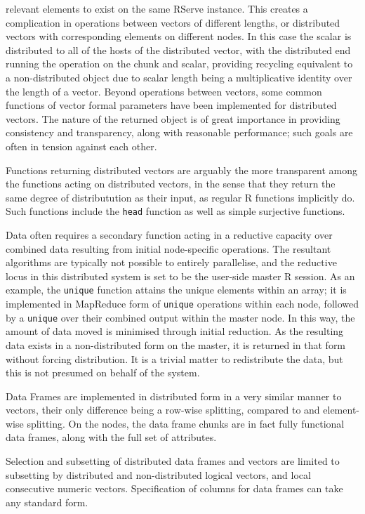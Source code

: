 relevant elements to exist on the same RServe instance. This creates a
complication in operations between vectors of different lengths, or
distributed vectors with corresponding elements on different nodes. In
this case the scalar is distributed to all of the hosts of the
distributed vector, with the distributed end running the operation on
the chunk and scalar, providing recycling equivalent to a
non-distributed object due to scalar length being a multiplicative
identity over the length of a vector. Beyond operations between vectors,
some common functions of vector formal parameters have been implemented
for distributed vectors. The nature of the returned object is of great
importance in providing consistency and transparency, along with
reasonable performance; such goals are often in tension against each
other.

Functions returning distributed vectors are arguably the more
transparent among the functions acting on distributed vectors, in the
sense that they return the same degree of distributution as their input,
as regular R functions implicitly do. Such functions include the
\texttt{head} function as well as simple surjective functions.

Data often requires a secondary function acting in a reductive capacity
over combined data resulting from initial node-specific operations. The
resultant algorithms are typically not possible to entirely parallelise,
and the reductive locus in this distributed system is set to be the
user-side master R session. As an example, the \texttt{unique} function
attains the unique elements within an array; it is implemented in
MapReduce form of \texttt{unique} operations within each node, followed
by a \texttt{unique} over their combined output within the master node.
In this way, the amount of data moved is minimised through initial
reduction. As the resulting data exists in a non-distributed form on the
master, it is returned in that form without forcing distribution. It is
a trivial matter to redistribute the data, but this is not presumed on
behalf of the system.

Data Frames are implemented in distributed form in a very similar manner
to vectors, their only difference being a row-wise splitting, compared
to and element-wise splitting. On the nodes, the data frame chunks are
in fact fully functional data frames, along with the full set of
attributes.

Selection and subsetting of distributed data frames and vectors are
limited to subsetting by distributed and non-distributed logical
vectors, and local consecutive numeric vectors. Specification of columns
for data frames can take any standard form.

